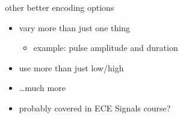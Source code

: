 \begin{frame}{other better encoding options}
    \begin{itemize}
    \item vary more than just one thing
        \begin{itemize}
        \item example: pulse amplitude and duration
        \end{itemize}
    \item use more than just low/high
    \item \ldots much more
    \vspace{.5cm}
    \item probably covered in ECE Signals course?
    \end{itemize}
\end{frame}

